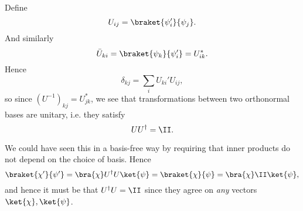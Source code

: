 Define
\begin{equation}
	U_{ij}= \braket{\psi_i'}{\psi_j}.
\end{equation}
And similarly
\begin{equation}
	\bar U_{ki} = \braket{\psi_k}{\psi_i'} = U_{ik}^*.
\end{equation}
Hence
\begin{equation}
	\delta_{kj} =\sum_i U_{ki}' U_{ij},
\end{equation}
so since $(U^{-1})_{kj} = U_{jk}^*$, we see that transformations between two orthonormal bases are unitary, i.e. they satisfy
\begin{equation}
	U U^\dagger = \II.
\end{equation}

We could have seen this in a basis-free way by requiring that inner products do not depend on the choice of basis. Hence
\begin{equation}
	\braket{\chi'}{\psi'}=\bra{\chi}U^\dagger U \ket{\psi} = \braket{\chi}{\psi} = \bra{\chi} \II \ket{\psi},
\end{equation}
and hence it must be that $U^\dagger U = \II$ since they agree on \emph{any} vectors $\ket{\chi},\ket{\psi}$.

